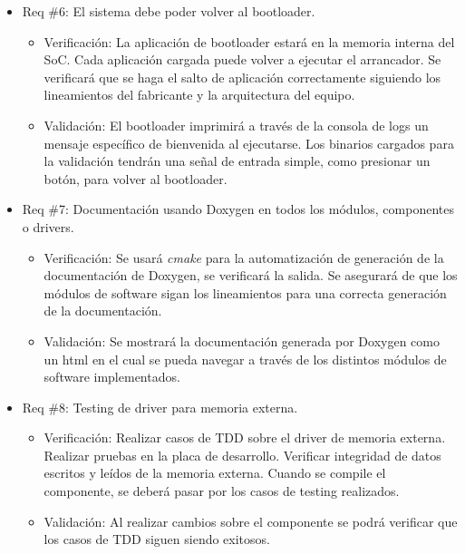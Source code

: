 \documentclass[
11pt, %
]{charter}
\begin{document}
\begin{itemize} 
\item Req \#6: El sistema debe poder volver al bootloader.

\begin{itemize}
	\item Verificación: La aplicación de bootloader estará en la memoria interna del SoC. Cada aplicación cargada puede volver a ejecutar el arrancador. Se verificará que se haga el salto de aplicación correctamente siguiendo los lineamientos del fabricante y la arquitectura del equipo.
	\item Validación: El bootloader imprimirá a través de la consola de logs un mensaje específico de bienvenida al ejecutarse. Los binarios cargados para la validación tendrán una señal de entrada simple, como presionar un botón, para volver al bootloader.
\end{itemize}

\end{itemize}

\begin{itemize} 
\item Req \#7: Documentación usando Doxygen en todos los módulos, componentes o drivers.

\begin{itemize}
	\item Verificación: Se usará \textit{cmake} para la automatización de generación de la documentación de Doxygen, se verificará la salida. Se asegurará de que los módulos de software sigan los lineamientos para una correcta generación de la documentación.
	\item Validación: Se mostrará la documentación generada por Doxygen como un html en el cual se pueda navegar a través de los distintos módulos de software implementados. 
\end{itemize}

\end{itemize}

\begin{itemize} 
\item Req \#8: Testing de driver para memoria externa.

\begin{itemize}
	\item Verificación: Realizar casos de TDD sobre el driver de memoria externa. Realizar pruebas en la placa de desarrollo. Verificar integridad de datos escritos y leídos de la memoria externa. Cuando se compile el componente, se deberá pasar por los casos de testing realizados.
	\item Validación: Al realizar cambios sobre el componente se podrá verificar que los casos de TDD siguen siendo exitosos.
\end{itemize}

\end{itemize}
\end{document}

